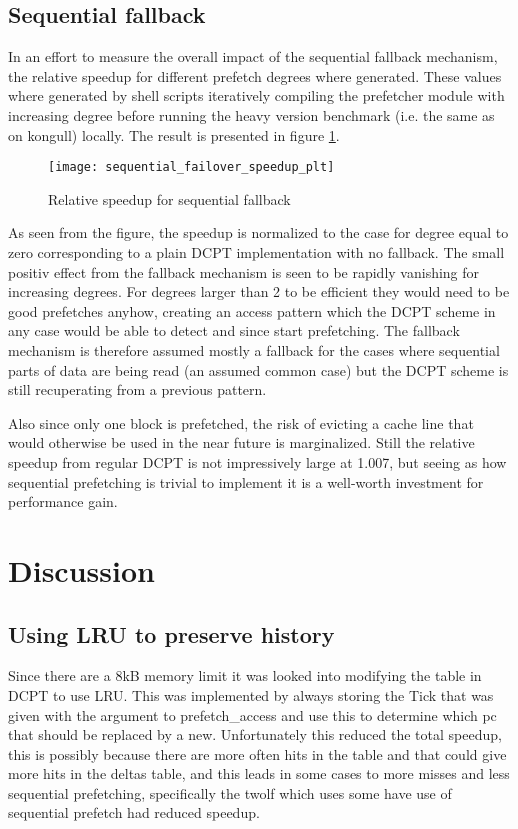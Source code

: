 \documentclass[12pt,journal,compsoc]{IEEEtran}
\begin{document}
\subsection{Sequential fallback}
In an effort to measure the overall impact of the sequential fallback
mechanism, the relative speedup for different prefetch degrees where
generated. These values where generated by shell scripts iteratively
compiling the prefetcher module with increasing degree before running
the heavy version benchmark (i.e. the same as on kongull) locally. The
result is presented in figure \ref{fig:fallback}.

\begin{figure}
\begin{center}
\texttt{[image: sequential\_failover\_speedup\_plt]}
\end{center}
\caption{\label{fig:fallback} Relative speedup for sequential fallback}
\end{figure}

As seen from the figure, the speedup is normalized to the case for degree equal
to zero corresponding to a plain DCPT implementation with no fallback. The
small positiv effect from the fallback mechanism is seen to be rapidly
vanishing for increasing degrees. For degrees larger than 2 to be efficient
they would need to be good prefetches anyhow, creating an access pattern which
the DCPT scheme in any case would be able to detect and since start
prefetching. The fallback mechanism is therefore assumed mostly a fallback for
the cases where sequential parts of data are being read
(an assumed common case) but the DCPT scheme is still recuperating from a
previous pattern.

Also since only one block is prefetched, the risk of evicting a cache line
that would otherwise be used in the near future is marginalized. Still the
relative speedup from regular DCPT is not impressively large at 1.007, but
seeing as how sequential prefetching is trivial to implement it is a
well-worth investment for performance gain.

\section{Discussion}
\subsection{Using LRU to preserve history}
Since there are a 8kB memory limit it was looked into modifying the table in DCPT to use LRU. This was implemented by always storing the Tick that was given with the argument to prefetch\_access and use this to determine which pc that should be replaced by a new. Unfortunately this reduced the total speedup, this is possibly because there are more often hits in the table and that could give more hits in the deltas table, and this leads in some cases to more misses and less sequential prefetching, specifically the twolf which uses some have use of sequential prefetch had reduced speedup.
\end{document}
